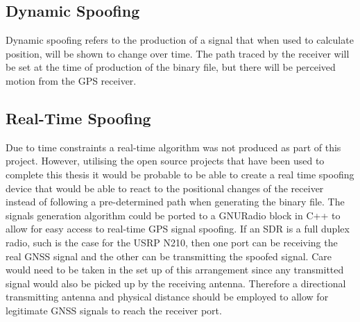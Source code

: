 \subsection{Dynamic Spoofing}
Dynamic spoofing refers to the production of a signal that when used to calculate position, will be shown to change over time. The path traced by the receiver will be
set at the time of production of the binary file, but there will be perceived motion from the GPS receiver.

\subsection{Real-Time Spoofing}
Due to time constraints a real-time algorithm was not produced as part of this project. However, utilising the open source projects that have been used to complete this
thesis it would be probable to be able to create a real time spoofing device that would be able to react to the positional changes of the receiver instead of following a
pre-determined path when generating the binary file. The signals generation algorithm could be ported to a GNURadio block in C++ to allow for easy access to real-time GPS
signal spoofing. If an SDR is a full duplex radio, such is the case for the USRP N210, then one port can be receiving the real GNSS signal and the other can be
transmitting the spoofed signal. Care would need to be taken in the set up of this arrangement since any transmitted signal would also be picked up by the receiving
antenna. Therefore a directional transmitting antenna and physical distance should be employed to allow for legitimate GNSS signals to reach the receiver port. 